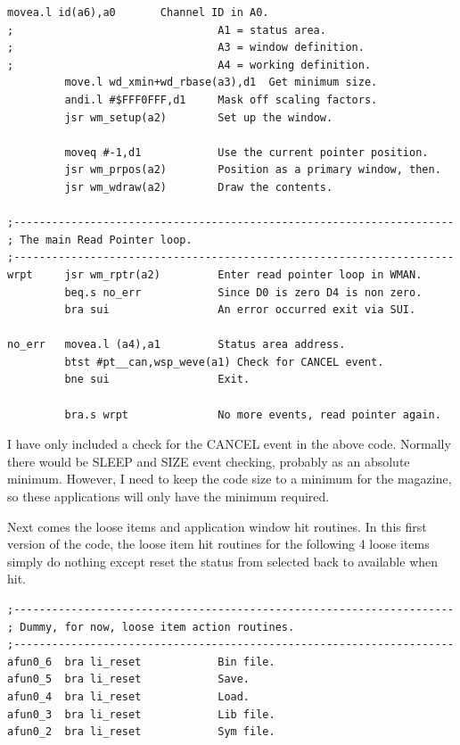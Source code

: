 \begin{lstlisting}[firstnumber=1,]
         movea.l id(a6),a0       Channel ID in A0.
;                                A1 = status area.
;                                A3 = window definition.
;                                A4 = working definition.
         move.l wd_xmin+wd_rbase(a3),d1  Get minimum size.
         andi.l #$FFF0FFF,d1     Mask off scaling factors.
         jsr wm_setup(a2)        Set up the window.

         moveq #-1,d1            Use the current pointer position.
         jsr wm_prpos(a2)        Position as a primary window, then.
         jsr wm_wdraw(a2)        Draw the contents.

;---------------------------------------------------------------------
; The main Read Pointer loop.
;---------------------------------------------------------------------
wrpt     jsr wm_rptr(a2)         Enter read pointer loop in WMAN.
         beq.s no_err            Since D0 is zero D4 is non zero.
         bra sui                 An error occurred exit via SUI.

no_err   movea.l (a4),a1         Status area address.
         btst #pt__can,wsp_weve(a1) Check for CANCEL event.
         bne sui                 Exit.

         bra.s wrpt              No more events, read pointer again.
\end{lstlisting}

I have only included a check for the CANCEL event in the above code.
    Normally there would be SLEEP and SIZE event checking, probably as an
    absolute minimum. However, I need to keep the code size to a minimum for
    the magazine, so these applications will only have the minimum
    required.

Next comes the loose items and application window hit routines. In
    this first version of the code, the loose item hit routines for the
    following 4 loose items simply do nothing except reset the status from
    selected back to available when hit.

\begin{lstlisting}[firstnumber=1,]
;---------------------------------------------------------------------
; Dummy, for now, loose item action routines.
;---------------------------------------------------------------------
afun0_6  bra li_reset            Bin file.
afun0_5  bra li_reset            Save.
afun0_4  bra li_reset            Load.
afun0_3  bra li_reset            Lib file.
afun0_2  bra li_reset            Sym file.
\end{lstlisting}

